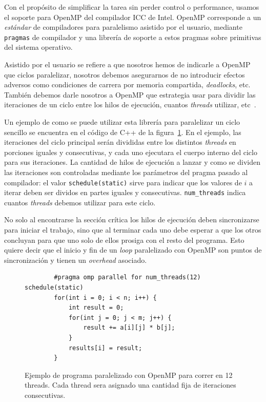 Con el prop\'osito de simplificar la tarea sin perder control o performance,
usamos el soporte para OpenMP del compilador ICC de Intel. OpenMP corresponde a
un \textit{est\'andar} de compiladores para paralelismo asistido por el usuario,
mediante \texttt{pragmas} de compilador y una librer\'ia de soporte a estos
pragmas sobre primitivas del sistema operativo.

Asistido por el usuario se refiere a que nosotros hemos de indicarle a OpenMP
que ciclos paralelizar, nosotros debemos asegurarnos de no introducir efectos
adversos como condiciones de carrera por memoria compartida, \textit{deadlocks},
etc. Tambi\'en debemos darle nosotros a OpenMP que estrategia usar para dividir
las iteraciones de un ciclo entre los hilos de ejecuci\'on, cuantos
\textit{threads} utilizar, etc~\cite{OpenMPIntel}.

Un ejemplo de como se puede utilizar esta librer\'ia para paralelizar un ciclo
sencillo se encuentra en el c\'odigo de C++ de la figura~\ref{fig:openmp-example}.
En el ejemplo, las iteraciones del ciclo principal ser\'an divididas entre los
distintos \textit{threads} en porciones iguales y consecutivas, y cada uno
ejecutara el cuerpo interno del ciclo para sus iteraciones. La cantidad de
hilos de ejecuci\'on a lanzar y como se dividen las iteraciones son controladas
mediante los par\'ametros del pragma pasado al compilador: el valor
\texttt{schedule(static)} sirve para indicar que los valores de $i$ a iterar
deben ser dividos en partes iguales y consecutivas. \texttt{num\_threads} indica
cuantos \textit{threads} debemos utilizar para este ciclo.

No solo al encontrarse la secci\'on cr\'itica los hilos de ejecuci\'on deben
sincronizarse para iniciar el trabajo, sino que al terminar cada uno debe esperar
a que los otros concluyan para que uno solo de ellos prosiga con el resto del
programa. Esto quiere decir que el inicio y fin de un \textit{loop} paralelizado
con OpenMP son puntos de sincronizaci\'on y tienen un \textit{overhead} asociado.

\begin{figure}[htbp]
    \begin{lstlisting}
        #pragma omp parallel for num_threads(12) schedule(static)
        for(int i = 0; i < n; i++) {
            int result = 0;
            for(int j = 0; j < m; j++) {
                result += a[i][j] * b[j];
            }
            results[i] = result;
        }
    \end{lstlisting}
    \caption{Ejemplo de programa paralelizado con OpenMP para correr en 12 threads. Cada thread
    sera asignado una cantidad fija de iteraciones consecutivas.}
    \label{fig:openmp-example}
\end{figure}

